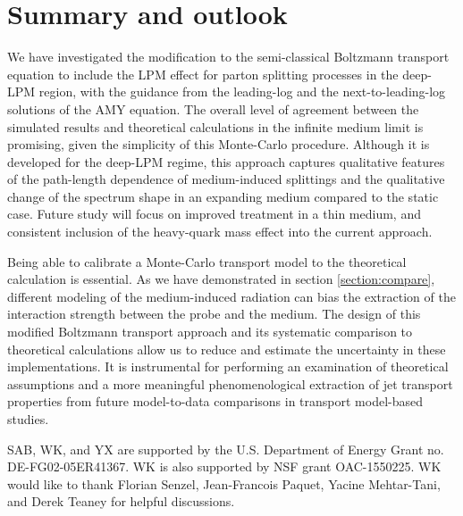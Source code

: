 \documentclass[aps, prc, reprint, amsmath, groupedaddress, nofootinbib]{revtex4-1}
\begin{document}
\section{Summary and outlook}\label{section:summary}
We have investigated the modification to the semi-classical Boltzmann transport equation to include the LPM effect for parton splitting processes in the deep-LPM region, with the guidance from the leading-log and the next-to-leading-log solutions of the AMY equation.
The overall level of agreement between the simulated results and theoretical calculations in the infinite medium limit is promising, given the simplicity of this Monte-Carlo procedure. 
Although it is developed for the deep-LPM regime, this approach captures qualitative features of the path-length dependence of medium-induced splittings and the qualitative change of the spectrum shape in an expanding medium compared to the static case.
Future study will focus on improved treatment in a thin medium, and consistent inclusion of the heavy-quark mass effect into the current approach.

Being able to calibrate a Monte-Carlo transport model to the theoretical calculation is essential.
As we have demonstrated in section \ref{section:compare}, different modeling of the medium-induced radiation can bias the extraction of the interaction strength between the probe and the medium.
The design of this modified Boltzmann transport approach and its systematic comparison to theoretical calculations allow us to reduce and estimate the uncertainty in these implementations.
It is instrumental for performing an examination of theoretical assumptions and a more meaningful phenomenological extraction of jet transport properties from future model-to-data comparisons in transport model-based studies.

\begin{acknowledgments}
SAB, WK, and YX are supported by the U.S. Department of Energy Grant no. DE-FG02-05ER41367. WK is also supported by NSF grant OAC-1550225.
WK would like to thank Florian Senzel, Jean-Francois Paquet, Yacine Mehtar-Tani, and Derek Teaney for helpful discussions.
\end{acknowledgments}
\end{document}
